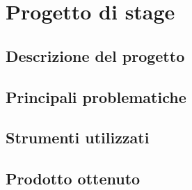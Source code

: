 
\chapter{Progetto di stage}
\label{cap:progetto-stage}

\section{Descrizione del progetto}

\section{Principali problematiche}

\section{Strumenti utilizzati}

\section{Prodotto ottenuto}


